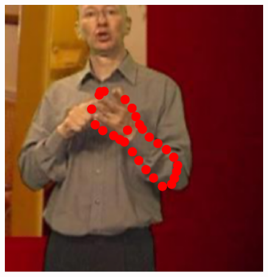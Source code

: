 \begin{figure}[!t]
    \includegraphics[height=\ofh]{resources/Annotation_Correction/Suplementory_Meterial/ExFit/0011.eps}
    \hfill

\end{figure}
